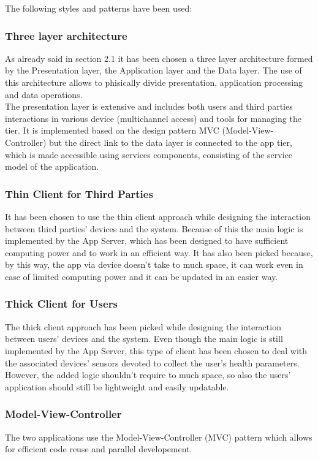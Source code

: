 The following styles and patterns have been used:

\subsubsection{Three layer architecture}
As already said in section 2.1 it has been chosen a three layer architecture formed by the Presentation layer, the Application layer and the Data layer. The use of this architecture allows to phisically divide presentation, application processing and data operations.\\
The presentation layer is extensive and includes both users and third parties interactions in various device (multichannel access) and tools for managing the tier. It is implemented based on the design pattern MVC (Model-View-Controller)  but the direct link to the data layer is connected to the app tier, which is made accessible using services components, consisting of the service model of the application.

\subsubsection{Thin Client for Third Parties}
It has been chosen to use the thin client approach while designing the interaction between third parties' devices and the system. Because of this the main logic is implemented by the App Server, which has been designed to have sufficient computing power and to work in an efficient way. It has also been picked because, by this way, the app via device doesn't take to much space, it can work even in case of limited computing power and it can be updated in an easier way.

\subsubsection{Thick Client for Users}
The thick client approach has been picked while designing the interaction between users' devices and the system. Even though the main logic is still implemented by the App Server, this type of client has been chosen to deal with the associated devices' sensors devoted to collect the user's health parameters. However, the added logic shouldn't require to much space, so also the users' application should still be lightweight and easily updatable.

\subsubsection{Model-View-Controller}
The two applications use the Model-View-Controller (MVC) pattern which allows for efficient code reuse and parallel developement.
